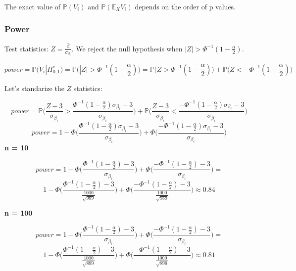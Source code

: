 \documentclass[
]{article}
\begin{document}
The exact value of \(\mathbb P(V_i)\) and \(\mathbb P(\mathbb E_X V_i)\)
depends on the order of p values.

\hypertarget{power-1}{%
\subsubsection{Power}\label{power-1}}

Test statistics: \(Z = \frac {\hat \beta} {\sigma_{\beta_i}}\). We
reject the null hypothesis when \(|Z| > \Phi^{-1}(1 - \frac \alpha 2)\).

\[power = \mathbb P(V_i | H_{0,  1}^c) = \mathbb P \Big(|Z| > \Phi^{-1}(1  - \frac \alpha 2)\Big) = \mathbb P \Big(Z > \Phi^{-1}(1  - \frac \alpha 2)\Big) + \mathbb P \Big(Z < - \Phi^{-1}(1  - \frac \alpha 2)\Big)\]

Let's standarize the \(Z\) statistics:

\[power = \mathbb P \Big(\frac{Z - 3}{\sigma_{\beta_i}} > \frac{\Phi^{-1}(1  - \frac \alpha 2)\sigma_{\beta_i} - 3}{\sigma_{\beta_i}}\Big) + \mathbb P \Big(\frac{Z - 3}{\sigma_{\beta_i}} < \frac{-\Phi^{-1}(1  - \frac \alpha 2)\sigma_{\beta_i} - 3}{\sigma_{\beta_i}}\Big)\]
\[power = 1 - \Phi\Big(\frac{\Phi^{-1}(1  - \frac \alpha 2)\sigma_{\beta_i} - 3}{\sigma_{\beta_i}}  \Big) + \Phi\Big(\frac{-\Phi^{-1}(1  - \frac \alpha 2)\sigma_{\beta_i} - 3}{\sigma_{\beta_i}} \Big)\]
\textbf{n = 10}

\begin{displaymath} power = 1 - \Phi\Big(\frac{\Phi^{-1}(1  - \frac \alpha 2) - 3}{\sigma_{\beta_i}}  \Big) + \Phi\Big( \frac{-\Phi^{-1}(1  - \frac \alpha 2) - 3} {\sigma_{\beta_i}} \Big) = 
  \end{displaymath}
\begin{displaymath}1 - \Phi\Big(\frac{\Phi^{-1}(1  - \frac \alpha 2) - 3}{ \frac {1000}{\sqrt{989}} }  \Big) + \Phi\Big( \frac{-\Phi^{-1}(1  - \frac \alpha 2) - 3} {\frac {1000}{\sqrt{989}}} \Big) \approx 0.84
\end{displaymath}

\textbf{n = 100}

\begin{displaymath} power = 1 - \Phi\Big(\frac{\Phi^{-1}(1  - \frac \alpha 2) - 3}{\sigma_{\beta_i}}  \Big) + \Phi\Big( \frac{-\Phi^{-1}(1  - \frac \alpha 2) - 3} {\sigma_{\beta_i}} \Big) = 
  \end{displaymath}
\begin{displaymath}1 - \Phi\Big(\frac{\Phi^{-1}(1  - \frac \alpha 2) - 3}{ \frac {1000}{\sqrt{899}} }  \Big) + \Phi\Big( \frac{-\Phi^{-1}(1  - \frac \alpha 2) - 3} {\frac {1000}{\sqrt{899}}} \Big) \approx 0.81
\end{displaymath}
\end{document}
